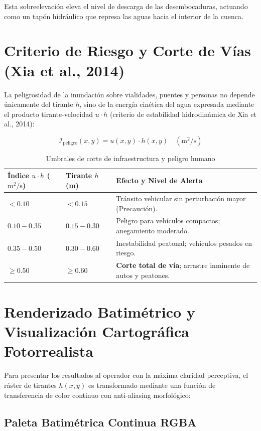 \documentclass[11pt,a4paper]{article}
\begin{document}
Esta sobreelevación eleva el nivel de descarga de las desembocaduras, actuando como un tapón hidráulico que represa las aguas hacia el interior de la cuenca.

\section{Criterio de Riesgo y Corte de Vías (Xia et al., 2014)}

La peligrosidad de la inundación sobre vialidades, puentes y personas no depende únicamente del tirante $h$, sino de la energía cinética del agua expresada mediante el producto tirante-velocidad $u \cdot h$ (criterio de estabilidad hidrodinámica de Xia et al., 2014):

\begin{equation}
  \mathcal{I}_{\text{peligro}}(x,y) = u(x,y) \cdot h(x,y) \quad (\text{m}^2/\text{s})
\end{equation}

\begin{table}[h]
\centering
\caption{Umbrales de corte de infraestructura y peligro humano}
\begin{tabular}{lll}
\toprule
\textbf{Índice $u \cdot h$ ($\text{m}^2/\text{s}$)} & \textbf{Tirante $h$ (m)} & \textbf{Efecto y Nivel de Alerta} \\
\midrule
$< 0.10$ & $< 0.15$ & Tránsito vehicular sin perturbación mayor (Precaución). \\
$0.10 - 0.35$ & $0.15 - 0.30$ & Peligro para vehículos compactos; anegamiento moderado. \\
$0.35 - 0.50$ & $0.30 - 0.60$ & Inestabilidad peatonal; vehículos pesados en riesgo. \\
$\ge 0.50$ & $\ge 0.60$ & \textbf{Corte total de vía}; arrastre inminente de autos y peatones. \\
\bottomrule
\end{tabular}
\end{table}

\section{Renderizado Batimétrico y Visualización Cartográfica Fotorrealista}

Para presentar los resultados al operador con la máxima claridad perceptiva, el ráster de tirantes $h(x,y)$ es transformado mediante una función de transferencia de color continuo con anti-aliasing morfológico:

\subsection{Paleta Batimétrica Continua RGBA}
\end{document}

